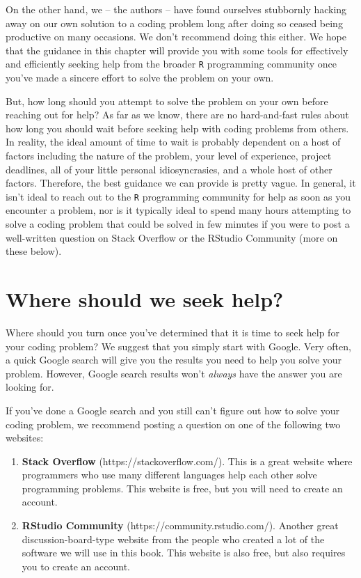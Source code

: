 \documentclass[
  letterpaper,
  DIV=11,
  numbers=noendperiod]{scrreprt}
\begin{document}
On the other hand, we -- the authors -- have found ourselves stubbornly
hacking away on our own solution to a coding problem long after doing so
ceased being productive on many occasions. We don't recommend doing this
either. We hope that the guidance in this chapter will provide you with
some tools for effectively and efficiently seeking help from the broader
\texttt{R} programming community once you've made a sincere effort to
solve the problem on your own.

But, how long should you attempt to solve the problem on your own before
reaching out for help? As far as we know, there are no hard-and-fast
rules about how long you should wait before seeking help with coding
problems from others. In reality, the ideal amount of time to wait is
probably dependent on a host of factors including the nature of the
problem, your level of experience, project deadlines, all of your little
personal idiosyncrasies, and a whole host of other factors. Therefore,
the best guidance we can provide is pretty vague. In general, it isn't
ideal to reach out to the \texttt{R} programming community for help as
soon as you encounter a problem, nor is it typically ideal to spend many
hours attempting to solve a coding problem that could be solved in few
minutes if you were to post a well-written question on Stack Overflow or
the RStudio Community (more on these below).

\section{Where should we seek help?}\label{where-should-we-seek-help}

Where should you turn once you've determined that it is time to seek
help for your coding problem? We suggest that you simply start with
Google. Very often, a quick Google search will give you the results you
need to help you solve your problem. However, Google search results
won't \emph{always} have the answer you are looking for.

If you've done a Google search and you still can't figure out how to
solve your coding problem, we recommend posting a question on one of the
following two websites:

\begin{enumerate}
\def\labelenumi{\arabic{enumi}.}
\item
  \textbf{Stack Overflow} (https://stackoverflow.com/). This is a great
  website where programmers who use many different languages help each
  other solve programming problems. This website is free, but you will
  need to create an account.
\item
  \textbf{RStudio Community} (https://community.rstudio.com/). Another
  great discussion-board-type website from the people who created a lot
  of the software we will use in this book. This website is also free,
  but also requires you to create an account.
\end{enumerate}
\end{document}

